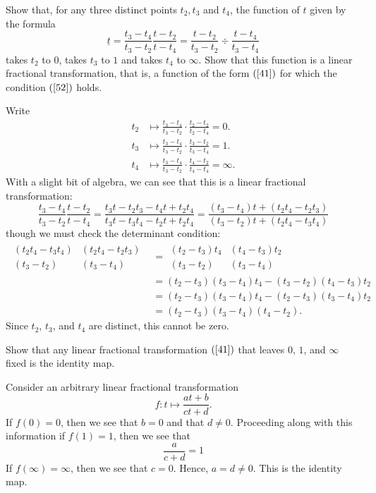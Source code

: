 \documentclass{ximera}
\begin{document}
\begin{problem}
\label{59}Show that, for any three distinct points $t_{2},t_{3}$ and $t_{4}$,
the function of $t$ given by the formula%
\[
\underline{t}=\frac{t_{3}-t_{4}}{t_{3}-t_{2}}\frac{t-t_{2}}{t-t_{4}}%
=\frac{t-t_{2}}{t_{3}-t_{2}}\div\frac{t-t_{4}}{t_{3}-t_{4}}%
\]
takes $t_{2}$ to $0$, takes $t_{3}$ to $1$ and takes $t_{4}$ to
$\infty$. Show that this function is a linear fractional
transformation, that is, a function of the form
$\left( \ref{41}\right) $ for which the condition $\left(
\ref{52}\right)$ holds.
\begin{freeResponse}
Write
\begin{align*}
t_2 &\mapsto \frac{t_3-t_4}{t_3-t_2} \cdot \frac{t_2-t_2}{t_2-t_4} = 0.\\
t_3 &\mapsto \frac{t_3-t_4}{t_3-t_2} \cdot \frac{t_3-t_2}{t_3-t_4} = 1.\\
t_4 &\mapsto \frac{t_3-t_4}{t_3-t_2} \cdot \frac{t_4-t_2}{t_4-t_4} = \infty.
\end{align*}
With a slight bit of algebra, we can see that this is a linear fractional transformation:
\[
\frac{t_{3}-t_{4}}{t_{3}-t_{2}}\frac{t-t_{2}}{t-t_{4}} = \frac{t_3t - t_2t_3-t_4t +t_2t_4}{t_3t-t_3t_4-t_2t+t_2t_4} = \frac{(t_3-t_4)t + (t_2t_4-t_2t_3)}{(t_3-t_2)t + (t_2t_4-t_3t_4)}
\]
though we must check the determinant condition:
\begin{align*}
\begin{array}{|cc|}
(t_2t_4 - t_3t_4) & (t_2t_4 - t_2t_3) \\
(t_3-t_2) & (t_3-t_4)
\end{array}
&=
\begin{array}{|cc|}
(t_2 - t_3)t_4 & (t_4 - t_3)t_2 \\
(t_3-t_2) & (t_3-t_4)
\end{array}\\
&=(t_2-t_3)(t_3-t_4)t_4 - (t_3-t_2)(t_4-t_3)t_2\\
&= (t_2-t_3)(t_3-t_4)t_4 - (t_2-t_3)(t_3-t_4)t_2\\
&= (t_2-t_3)(t_3-t_4)(t_4 -t_2).
\end{align*}
Since $t_2$, $t_3$, and $t_4$ are distinct, this cannot be
zero.
\end{freeResponse}
\end{problem}





\begin{problem}
\label{57}Show that any linear fractional transformation $\left(
\ref{41}\right)$ that leaves $0$, $1$, and $\infty$ fixed is the identity map.
\begin{freeResponse}
Consider an arbitrary linear fractional transformation
\[
f:t \mapsto \frac{at +b}{ct+d}.
\]
If $f(0)=0$, then we see that $b=0$ and that $d\ne 0$. Proceeding
along with this information if $f(1) = 1$, then we see that
\[
\frac{a}{c+d} = 1
\]
If $f(\infty) = \infty$, then we see that $c=0$. Hence, $a=d\ne
0$. This is the identity map.  \end{freeResponse}
\end{problem}
\end{document}
